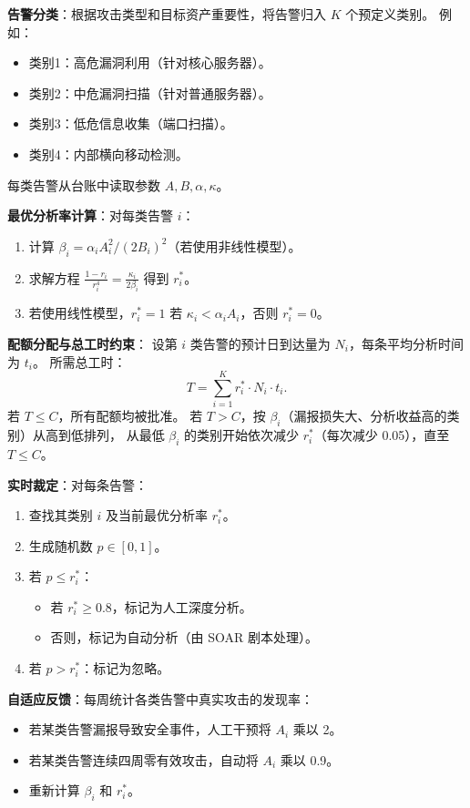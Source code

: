 \documentclass[11pt,a4paper]{article}
\begin{document}
\textbf{告警分类}：根据攻击类型和目标资产重要性，将告警归入 $K$ 个预定义类别。
例如：
\begin{itemize}
    \item 类别1：高危漏洞利用（针对核心服务器）。
    \item 类别2：中危漏洞扫描（针对普通服务器）。
    \item 类别3：低危信息收集（端口扫描）。
    \item 类别4：内部横向移动检测。
\end{itemize}

每类告警从台账中读取参数 $A, B, \alpha, \kappa$。

\textbf{最优分析率计算}：对每类告警 $i$：
\begin{enumerate}
    \item 计算 $\beta_i = \alpha_i A_i^2 / (2B_i)^2$（若使用非线性模型）。
    \item 求解方程 $\frac{1 - r_i}{r_i^4} = \frac{\kappa_i}{2\beta_i}$ 得到 $r_i^*$。
    \item 若使用线性模型，$r_i^* = 1$ 若 $\kappa_i < \alpha_i A_i$，否则 $r_i^* = 0$。
\end{enumerate}

\textbf{配额分配与总工时约束}：
设第 $i$ 类告警的预计日到达量为 $N_i$，每条平均分析时间为 $t_i$。
所需总工时：
\[
T = \sum_{i=1}^{K} r_i^* \cdot N_i \cdot t_i.
\]
若 $T \le C$，所有配额均被批准。
若 $T > C$，按 $\beta_i$（漏报损失大、分析收益高的类别）从高到低排列，
从最低 $\beta_i$ 的类别开始依次减少 $r_i^*$（每次减少 0.05），直至 $T \le C$。

\textbf{实时裁定}：对每条告警：
\begin{enumerate}
    \item 查找其类别 $i$ 及当前最优分析率 $r_i^*$。
    \item 生成随机数 $p \in [0,1]$。
    \item 若 $p \le r_i^*$：
    \begin{itemize}
        \item 若 $r_i^* \ge 0.8$，标记为人工深度分析。
        \item 否则，标记为自动分析（由 SOAR 剧本处理）。
    \end{itemize}
    \item 若 $p > r_i^*$：标记为忽略。
\end{enumerate}

\textbf{自适应反馈}：每周统计各类告警中真实攻击的发现率：
\begin{itemize}
    \item 若某类告警漏报导致安全事件，人工干预将 $A_i$ 乘以 2。
    \item 若某类告警连续四周零有效攻击，自动将 $A_i$ 乘以 0.9。
    \item 重新计算 $\beta_i$ 和 $r_i^*$。
\end{itemize}
\end{document}
